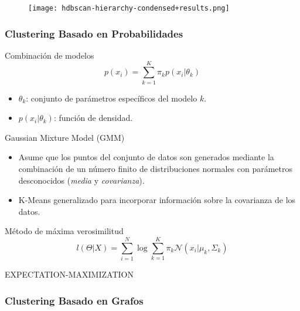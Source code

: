 \begin{frame}

    \begin{figure}[!h]
        \centering
        \texttt{[image: hdbscan-hierarchy-condensed+results.png]}
    \end{figure}

\end{frame}

\begin{frame}
    \frametitle{Clustering Basado en Probabilidades}

    \begin{block}{Combinación de modelos}
        \begin{equation*}
            p(x_i)=\sum_{k=1}^{K}{\pi_k p(x_i|\theta_k)}
        \end{equation*}
    \end{block}

    \begin{itemize}
        \item $\theta_k$: conjunto de parámetros específicos del modelo $k$.
        \item $p(x_i|\theta_k)$: función de densidad.
    \end{itemize}

\end{frame}

\begin{frame}

    \begin{block}{Gaussian Mixture Model (GMM)}
        \begin{itemize}
            \item<2-> Asume que los puntos del conjunto de datos son generados mediante la combinación de un número finito de distribuciones normales con parámetros desconocidos (\textit{media} y \textit{covarianza}).
            \item<3-> K-Means generalizado para incorporar información sobre la covarianza de los datos.
        \end{itemize}
    \end{block}

    \pause
    \begin{block}{Método de máxima verosimilitud}
        \begin{equation*}
            l(\Theta|X) = \sum_{i=1}^{N}{\log{\sum_{k=1}^{K}{\pi_k \mathcal{N}(x_i|\mu_k,\Sigma_k)}}}
        \end{equation*}
    \end{block}

    \pause
    \alert{EXPECTATION-MAXIMIZATION}

\end{frame}

\begin{frame}
    \frametitle{Clustering Basado en Grafos}

\end{frame}